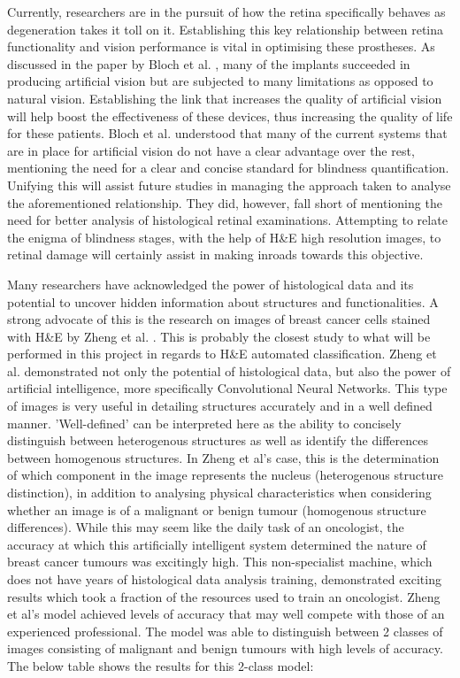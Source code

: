 \documentclass[a4paper]{article}
\begin{document}
        Currently, researchers are in the pursuit of how the retina specifically behaves as degeneration takes it toll on it. Establishing this key relationship between retina functionality and vision performance is vital in optimising these prostheses. As discussed in the paper by Bloch et al. \cite{RN10}, many of the implants succeeded in producing artificial vision but are subjected to many limitations as opposed to natural vision. Establishing the link that increases the quality of artificial vision will help boost the effectiveness of these devices, thus increasing the quality of life for these patients. Bloch et al. \cite{RN10} understood that many of the current systems that are in place for artificial vision do not have a clear advantage over the rest, mentioning the need for a clear and concise standard for blindness quantification. Unifying this will assist future studies in managing the approach taken to analyse the aforementioned relationship. They did, however, fall short of mentioning the need for better analysis of histological retinal examinations. Attempting to relate the enigma of blindness stages, with the help of H\&E high resolution images, to retinal damage will certainly assist in making inroads towards this objective.
        \vspace{3mm}

        Many researchers have acknowledged the power of histological data and its potential to uncover hidden information about structures and functionalities. A strong advocate of this is the research on images of breast cancer cells stained with H\&E by Zheng et al. \cite{RN13}. This is probably the closest study to what will be performed in this project in regards to H\&E automated classification. Zheng et al. demonstrated not only the potential of histological data, but also the power of artificial intelligence, more specifically Convolutional Neural Networks. This type of images is very useful in detailing structures accurately and in a well defined manner. 'Well-defined' can be interpreted here as the ability to concisely distinguish between heterogenous structures as well as identify the differences between homogenous structures. In Zheng et al's case, this is the determination of which component in the image represents the nucleus (heterogenous structure distinction), in addition to analysing physical characteristics when considering whether an image is of a malignant or benign tumour (homogenous structure differences). While this may seem like the daily task of an oncologist, the accuracy at which this artificially intelligent system determined the nature of breast cancer tumours was excitingly high. This non-specialist machine, which does not have years of histological data analysis training, demonstrated exciting results which took a fraction of the resources used to train an oncologist. Zheng et al's model achieved levels of accuracy that may well compete with those of an experienced professional. The model was able to distinguish between 2 classes of images consisting of malignant and benign tumours with high levels of accuracy. The below table shows the results for this 2-class model:
        \vspace{3mm}
\end{document}
